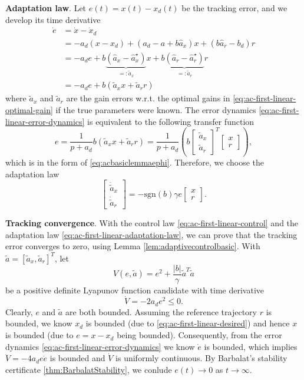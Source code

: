 \documentclass[
]{book}
\theoremstyle{definition}
\theoremstyle{definition}
\theoremstyle{definition}
\theoremstyle{definition}
\theoremstyle{remark}
\begin{document}
\textbf{Adaptation law}. Let \(e(t) = x(t) - x_d(t)\) be the tracking error, and we develop its time derivative
\begin{align}
\dot{e} &= \dot{x} - \dot{x}_d \\
        &= - a_d (x - x_d) + (a_d - a + b\hat{a}_x)x + (b \hat{a}_r - b_d) r \\
        & = - a_d e + b\underbrace{(\hat{a}_x - \hat{a}_x^\star)}_{=:\tilde{a}_x} x + b \underbrace{(\hat{a}_r - \hat{a}_r^\star )}_{=:\tilde{a}_r} r \\
        & = - a_d e + b (\tilde{a}_x x + \tilde{a}_r r) \label{eq:ac-first-linear-error-dynamics}
\end{align}
where \(\tilde{a}_x\) and \(\tilde{a}_r\) are the gain errors w.r.t. the optimal gains in \eqref{eq:ac-first-linear-optimal-gain} if the true parameters were known. The error dynamics \eqref{eq:ac-first-linear-error-dynamics} is equivalent to the following transfer function
\begin{equation}
e = \frac{1}{p + a_d} b(\tilde{a}_x x + \tilde{a}_r r) = \frac{1}{p + a_d} \left(b 
\begin{bmatrix} \tilde{a}_x \\ \tilde{a}_r \end{bmatrix}^T 
\begin{bmatrix} x \\ r \end{bmatrix}
\right),
\label{eq:ac-first-linear-error-dynamics-transfer}
\end{equation}
which is in the form of \eqref{eq:acbasiclemmaephi}. Therefore, we choose the adaptation law
\begin{equation}
\begin{bmatrix} \dot{\tilde{a}}_x \\ \dot{\tilde{a}}_r \end{bmatrix} = - \mathrm{sgn}(b) \gamma e \begin{bmatrix} x \\ r \end{bmatrix}.
\label{eq:ac-first-linear-adaptation-law}
\end{equation}

\textbf{Tracking convergence}. With the control law \eqref{eq:ac-first-linear-control} and the adaptation law \eqref{eq:ac-first-linear-adaptation-law}, we can prove that the tracking error converges to zero, using Lemma \ref{lem:adaptivecontrolbasic}. With \(\tilde{a}=[\tilde{a}_x, \tilde{a}_r]^T\), let
\[
V(e,\tilde{a}) = e^2 + \frac{|b|}{\gamma} \tilde{a}^T \tilde{a}
\]
be a positive definite Lyapunov function candidate with time derivative
\[
\dot{V} = - 2a_d e^2 \leq 0.
\]
Clearly, \(e\) and \(\tilde{a}\) are both bounded. Assuming the reference trajectory \(r\) is bounded, we know \(x_d\) is bounded (due to \eqref{eq:ac-first-linear-desired}) and hence \(x\) is bounded (due to \(e = x - x_d\) being bounded). Consequently, from the error dynamics \eqref{eq:ac-first-linear-error-dynamics} we know \(\dot{e}\) is bounded, which implies \(\ddot{V} = -4a_d e \dot{e}\) is bounded and \(\dot{V}\) is uniformly continuous. By Barbalat's stability certificate \ref{thm:BarbalatStability}, we conlude \(e(t) \rightarrow 0\) as \(t \rightarrow \infty\).
\end{document}
